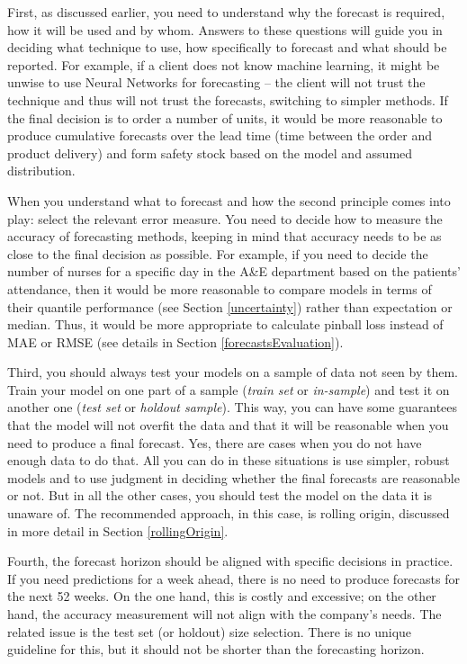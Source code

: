\documentclass[
]{book}
\theoremstyle{definition}
\theoremstyle{definition}
\theoremstyle{definition}
\theoremstyle{definition}
\theoremstyle{remark}
\begin{document}
First, as discussed earlier, you need to understand why the forecast is required, how it will be used and by whom. Answers to these questions will guide you in deciding what technique to use, how specifically to forecast and what should be reported. For example, if a client does not know machine learning, it might be unwise to use Neural Networks for forecasting -- the client will not trust the technique and thus will not trust the forecasts, switching to simpler methods. If the final decision is to order a number of units, it would be more reasonable to produce cumulative forecasts over the lead time (time between the order and product delivery) and form safety stock based on the model and assumed distribution.

When you understand what to forecast and how the second principle comes into play: select the relevant error measure. You need to decide how to measure the accuracy of forecasting methods, keeping in mind that accuracy needs to be as close to the final decision as possible. For example, if you need to decide the number of nurses for a specific day in the A\&E department based on the patients' attendance, then it would be more reasonable to compare models in terms of their quantile performance (see Section \ref{uncertainty}) rather than expectation or median. Thus, it would be more appropriate to calculate pinball loss instead of MAE or RMSE (see details in Section \ref{forecastsEvaluation}).

Third, you should always test your models on a sample of data not seen by them. Train your model on one part of a sample (\emph{train set} or \emph{in-sample}) and test it on another one (\emph{test set} or \emph{holdout sample}). This way, you can have some guarantees that the model will not overfit the data and that it will be reasonable when you need to produce a final forecast. Yes, there are cases when you do not have enough data to do that. All you can do in these situations is use simpler, robust models \citetext{\citealp[for example, damped trend exponential smoothing by][]{Roberts1982}; \citealp[and][]{Gardner1985a}; \citealp[or Theta by][]{Assimakopoulos2000}} and to use judgment in deciding whether the final forecasts are reasonable or not. But in all the other cases, you should test the model on the data it is unaware of. The recommended approach, in this case, is rolling origin, discussed in more detail in Section \ref{rollingOrigin}.

Fourth, the forecast horizon should be aligned with specific decisions in practice. If you need predictions for a week ahead, there is no need to produce forecasts for the next 52 weeks. On the one hand, this is costly and excessive; on the other hand, the accuracy measurement will not align with the company's needs. The related issue is the test set (or holdout) size selection. There is no unique guideline for this, but it should not be shorter than the forecasting horizon.
\end{document}
